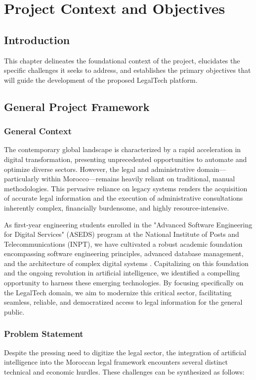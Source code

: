 \chapter{Project Context and Objectives}
\label{chap:Project_Context_and_Objectives}

\section*{Introduction}
This chapter delineates the foundational context of the project, elucidates the specific challenges it seeks to address, and establishes the primary objectives that will guide the development of the proposed LegalTech platform.

\section{General Project Framework}

\subsection{General Context}
The contemporary global landscape is characterized by a rapid acceleration in digital transformation, presenting unprecedented opportunities to automate and optimize diverse sectors. However, the legal and administrative domain—particularly within Morocco—remains heavily reliant on traditional, manual methodologies. This pervasive reliance on legacy systems renders the acquisition of accurate legal information and the execution of administrative consultations inherently complex, financially burdensome, and highly resource-intensive.

As first-year engineering students enrolled in the "Advanced Software Engineering for Digital Services" (ASEDS) program at the National Institute of Posts and Telecommunications (INPT), we have cultivated a robust academic foundation encompassing software engineering principles, advanced database management, and the architecture of complex digital systems \cite{ref2}. Capitalizing on this foundation and the ongoing revolution in artificial intelligence, we identified a compelling opportunity to harness these emerging technologies. By focusing specifically on the LegalTech domain, we aim to modernize this critical sector, facilitating seamless, reliable, and democratized access to legal information for the general public.

\subsection{Problem Statement}
Despite the pressing need to digitize the legal sector, the integration of artificial intelligence into the Moroccan legal framework encounters several distinct technical and economic hurdles. These challenges can be synthesized as follows:

